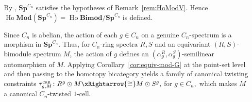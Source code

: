\documentclass[11pt,oneside]{amsart}
\DeclareMathOperator{\Ho}{Ho}
\numberwithin{equation}{section}
\numberwithin{figure}{section}
\theoremstyle{plain}
\theoremstyle{definition}
\theoremstyle{remark}
\begin{document}
\begin{example}
\label{ex:HoBimodSpCn}
By \cite[Example~4.1.1(1)]{AGHKK},
\(\mathbf{Sp}^{C_n}\) satisfies the hypotheses of
Remark~\ref{rem:HoModV}. Hence
\(
\Ho\mathbf{Mod}(\mathbf{Sp}^{C_n})
=
\Ho\mathbf{Bimod}/\mathbf{Sp}^{C_n}
\)
is defined.

Since \(C_n\) is abelian, the action of each \(g\in C_n\) on a
genuine \(C_n\)-spectrum is a morphism in
\(\mathbf{Sp}^{C_n}\). Thus, for \(C_n\)-ring spectra \(R,S\) and an
equivariant \((R,S)\)-bimodule spectrum \(M\), the action of \(g\)
defines an
\((\alpha_g^R,\alpha_g^S)\)-semilinear automorphism of \(M\).
Applying Corollary~\ref{cor:equiv-mod-G} at the point-set level and
then passing to the homotopy bicategory yields a family of canonical
twisting constraints
\(
\tau_{g,M}^{\mathrm{can}}\colon
R^g\odot M
\xRightarrow{\cong}
M\odot S^g,\) for \(g\in C_n,
\)
which makes \(M\) a canonical \(C_n\)-twisted \(1\)-cell.
\end{example}
 
\end{document}
